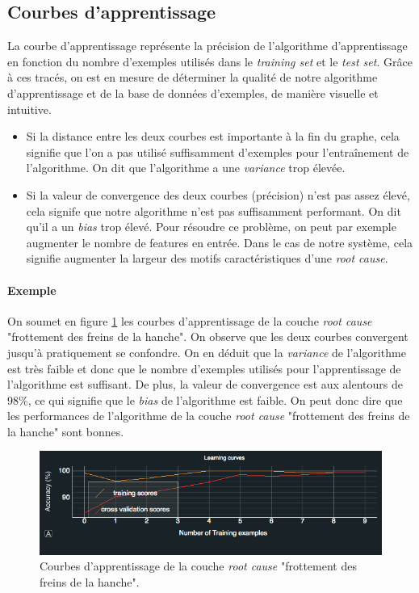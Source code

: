 \subsection{Courbes d'apprentissage}
\label{Industrialisation du produit: Performances de la solution:Courbes d'apprentissage}
La courbe d'apprentissage représente la précision de l'algorithme d'apprentissage en fonction du nombre d'exemples utilisés dans le \emph{training set} et le \emph{test set}. Grâce à ces tracés, on est en mesure de déterminer la qualité de notre algorithme d'apprentissage et de la base de données d'exemples, de manière visuelle et intuitive. 
\begin{itemize}
	\item Si la distance entre les deux courbes est importante à la fin du graphe, cela signifie que l'on a pas utilisé suffisamment d'exemples pour l'entraînement de l'algorithme. On dit que l'algorithme a une \emph{variance} trop élevée. 
	\item Si la valeur de convergence des deux courbes (précision) n'est pas assez élevé, cela signife que notre algorithme n'est pas suffisamment performant. On dit qu'il a un \emph{bias} trop élevé. Pour résoudre ce problème, on peut par exemple augmenter le nombre de features en entrée. Dans le cas de notre système, cela signifie augmenter la largeur des motifs caractéristiques d'une \emph{root cause}.
\end{itemize}

\paragraph{Exemple}
On soumet en figure \ref{fig:Courbes d'apprentissage} les courbes d'apprentissage de la couche \emph{root cause} "frottement des freins de la hanche". On observe que les deux courbes convergent jusqu'à pratiquement se confondre. On en déduit que la \emph{variance} de l'algorithme est très faible et donc que le nombre d'exemples utilisés pour l'apprentissage de l'algorithme est suffisant. De plus, la valeur de convergence est aux alentours de 98\%, ce qui signifie que le \emph{bias} de l'algorithme est faible. On peut donc dire que les performances de l'algorithme de la couche \emph{root cause} "frottement des freins de la hanche" sont bonnes. 

\begin{figure}[h]
\centering\includegraphics[width=12cm]{images/courbe_apprentissage.png}
\caption[Courbes d'apprentissage]{Courbes d'apprentissage de la couche \emph{root cause} "frottement des freins de la hanche".}
\label{fig:Courbes d'apprentissage}
\end{figure}